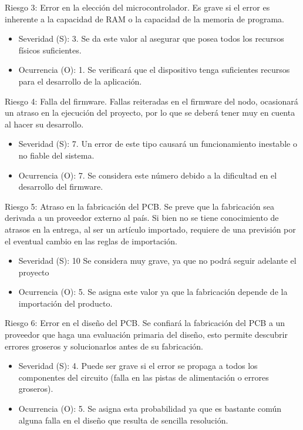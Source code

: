 \documentclass[11pt]{charter}
\begin{document}
Riesgo 3: Error en la elección del microcontrolador. Es grave si el error es inherente a la capacidad de RAM o la capacidad de la memoria de programa.
\begin{itemize}
\item Severidad (S): 3. Se da este valor al asegurar que posea todos los recursos físicos suficientes.
\item Ocurrencia (O): 1. Se verificará que el dispositivo tenga suficientes recursos para el desarrollo de la aplicación.
\end{itemize}

Riesgo 4: Falla del firmware. Fallas reiteradas en el firmware del nodo, ocasionará un atraso en la ejecución del proyecto, por lo que se deberá tener muy en cuenta al hacer su desarrollo. 
\begin{itemize}
\item Severidad (S): 7. Un error de este tipo causará un funcionamiento inestable o no fiable del sistema.
\item Ocurrencia (O): 7. Se considera este número debido a la dificultad en el desarrollo del firmware.
\end{itemize}

Riesgo 5: Atraso en la fabricación del PCB. Se preve que la fabricación sea derivada a un proveedor externo al país. Si bien no se tiene conocimiento de atrasos en la entrega, al ser un artículo importado, requiere de una previsión por el eventual cambio en las reglas de importación.
\begin{itemize}
\item Severidad (S): 10 Se considera muy grave, ya que no podrá seguir adelante el proyecto
\item Ocurrencia (O): 5. Se asigna este valor ya que la fabricación depende de la importación del producto. 
\end{itemize}

Riesgo 6: Error en el diseño del PCB. Se confiará la fabricación del PCB a un proveedor que haga una evaluación primaria del diseño, esto permite descubrir errores groseros y solucionarlos antes de su fabricación.
\begin{itemize}
\item Severidad (S): 4. Puede ser grave si el error se propaga a todos los componentes del circuito (falla en las pistas de alimentación o errores groseros).
\item Ocurrencia (O): 5. Se asigna esta probabilidad ya que es bastante común alguna falla en el diseño que resulta de sencilla resolución.
\end{itemize}
\end{document}
